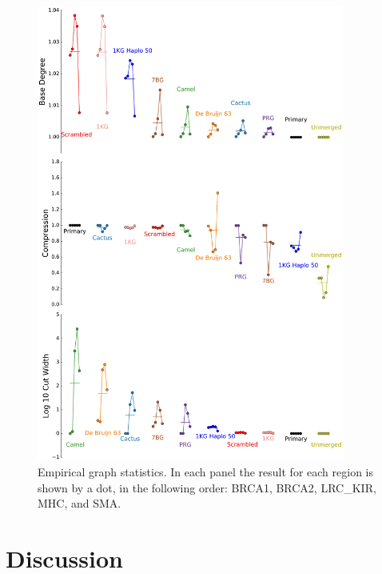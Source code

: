 \begin{figure}[htbp]
\centering
\includegraphics[width=0.9\textwidth]{figures/04_bakeoff/figure07.png}
\caption[Empirical graph statistics]{Empirical graph statistics. In each panel the result for each
region is shown by a dot, in the following order: BRCA1, BRCA2,
LRC\_KIR, MHC, and SMA.}
\label{fig:bakeoff:graphstats}
\end{figure}

\section{Discussion}

